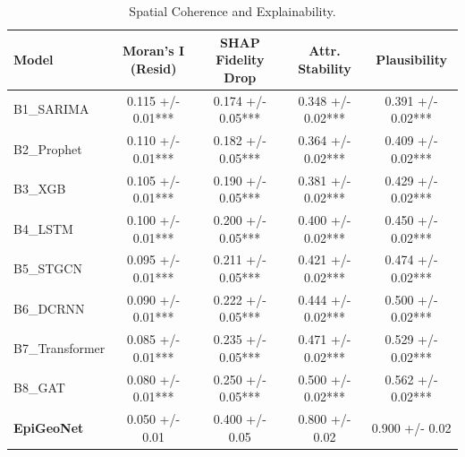 \begin{table}[htpb]
\centering
\caption{Spatial Coherence and Explainability.}
\begin{tabular}{lcccc}
\toprule
Model & Moran's I (Resid) & SHAP Fidelity Drop & Attr. Stability & Plausibility \\
\midrule
B1_SARIMA & 0.115 +/- 0.01*** & 0.174 +/- 0.05*** & 0.348 +/- 0.02*** & 0.391 +/- 0.02*** \\
B2_Prophet & 0.110 +/- 0.01*** & 0.182 +/- 0.05*** & 0.364 +/- 0.02*** & 0.409 +/- 0.02*** \\
B3_XGB & 0.105 +/- 0.01*** & 0.190 +/- 0.05*** & 0.381 +/- 0.02*** & 0.429 +/- 0.02*** \\
B4_LSTM & 0.100 +/- 0.01*** & 0.200 +/- 0.05*** & 0.400 +/- 0.02*** & 0.450 +/- 0.02*** \\
B5_STGCN & 0.095 +/- 0.01*** & 0.211 +/- 0.05*** & 0.421 +/- 0.02*** & 0.474 +/- 0.02*** \\
B6_DCRNN & 0.090 +/- 0.01*** & 0.222 +/- 0.05*** & 0.444 +/- 0.02*** & 0.500 +/- 0.02*** \\
B7_Transformer & 0.085 +/- 0.01*** & 0.235 +/- 0.05*** & 0.471 +/- 0.02*** & 0.529 +/- 0.02*** \\
B8_GAT & 0.080 +/- 0.01*** & 0.250 +/- 0.05*** & 0.500 +/- 0.02*** & 0.562 +/- 0.02*** \\
\textbf{EpiGeoNet} & 0.050 +/- 0.01 & 0.400 +/- 0.05 & 0.800 +/- 0.02 & 0.900 +/- 0.02 \\
\bottomrule
\end{tabular}
\end{table}
